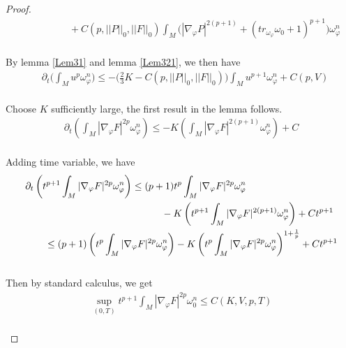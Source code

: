 \documentclass[11pt]{amsart}
\numberwithin{equation}{section}
\begin{document}
\begin{proof}
\begin{align}
	&\qquad\qquad  +C(p,||P||_0,||F||_0) \int_M \big( |\nabla_\varphi P|^{2(p+1)} +(tr_{\omega_{\varphi}}\omega_0 +1)^{p+1}\big) \omega_\varphi^n
\end{align}\\
By lemma \ref{Lem31} and lemma \ref{Lem321}, we then have
\begin{align}
	&\partial_t\big( \int_M u^p\omega_\varphi^n\big)\le -\big(\frac{2}{3} K-C(p,||P||_0,||F||_0)\big) \int_M u^{p+1}\omega_\varphi^n +C(p,V) 
\end{align}\\
Choose $K$ sufficiently large, the first result in the lemma follows. 
\begin{align}
 		\partial_t\left( \int_M |\nabla_\varphi F|^{2p}\omega_\varphi^n\right) \le -K \left( \int_M |\nabla_\varphi F|^{2(p+1)}\omega_\varphi^n\right) + C
 	\end{align}\\
Adding time variable, we have 
	\begin{align}
		&\partial_t\left( t^{p+1} \int_M |\nabla_\varphi F|^{2p}\omega_\varphi^n\right) \le (p+1)t^p  \int_M |\nabla_\varphi F|^{2p}\omega_\varphi^n \notag\\
		&\qquad\qquad\qquad\qquad\qquad\qquad\qquad  -K \left( t^{p+1} \int_M |\nabla_\varphi F|^{2(p+1)}\omega_\varphi^n\right) + C t^{p+1} \notag\\
		&\quad\quad \le (p+1)\left( t^p  \int_M |\nabla_\varphi F|^{2p}\omega_\varphi^n \right) -K \left( t^{p} \int_M |\nabla_\varphi F|^{2p}\omega_\varphi^n\right)^{1+\frac{1}{p}} + C t^{p+1} 
	\end{align}\\
	Then by standard calculus, we get 
	\begin{align}
		\sup_{(0,T)} t^{p+1} \int_M |\nabla_\varphi F|^{2p}\omega_0^n \le C(K,V,p,T)
	\end{align}\\
\end{proof}
\end{document}
